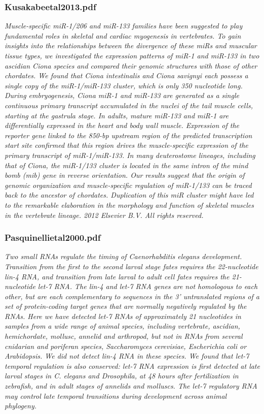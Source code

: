 \documentclass[graybox]{svmult}
\begin{document}
\subsubsection{Kusakabeetal2013.pdf}
\cite{Kusakabe2013}
\textit{Muscle-specific miR-1/206 and miR-133 families have been suggested to play fundamental roles in skeletal and cardiac myogenesis in vertebrates. To gain insights into the relationships between the divergence of these miRs and muscular tissue types, we investigated the expression patterns of miR-1 and miR-133 in two ascidian Ciona species and compared their genomic structures with those of other chordates. We found that Ciona intestinalis and Ciona savignyi each possess a single copy of the miR-1/miR-133 cluster, which is only 350 nucleotide long. During embryogenesis, Ciona miR-1 and miR-133 are generated as a single continuous primary transcript accumulated in the nuclei of the tail muscle cells, starting at the gastrula stage. In adults, mature miR-133 and miR-1 are differentially expressed in the heart and body wall muscle. Expression of the reporter gene linked to the 850-bp upstream region of the predicted transcription start site confirmed that this region drives the muscle-specific expression of the primary transcript of miR-1/miR-133. In many deuterostome lineages, including that of Ciona, the miR-1/133 cluster is located in the same intron of the mind bomb (mib) gene in reverse orientation. Our results suggest that the origin of genomic organization and muscle-specific regulation of miR-1/133 can be traced back to the ancestor of chordates. Duplication of this miR cluster might have led to the remarkable elaboration in the morphology and function of skeletal muscles in the vertebrate lineage. {\textcopyright} 2012 Elsevier B.V. All rights reserved.}

\subsubsection{Pasquinellietal2000.pdf}

\cite{Pasquinelli2000}
\textit{Two small RNAs regulate the timing of Caenorhabditis elegans development. Transition from the first to the second larval stage fates requires the 22-nucleotide lin-4 RNA, and transition from late larval to adult cell fates requires the 21-nucleotide let-7 RNA. The lin-4 and let-7 RNA genes are not homologous to each other, but are each complementary to sequences in the 3' untranslated regions of a set of protein-coding target genes that are normally negatively regulated by the RNAs. Here we have detected let-7 RNAs of approximately 21 nucleotides in samples from a wide range of animal species, including vertebrate, ascidian, hemichordate, mollusc, annelid and arthropod, but not in RNAs from several cnidarian and poriferan species, Saccharomyces cerevisiae, Escherichia coli or Arabidopsis. We did not detect lin-4 RNA in these species. We found that let-7 temporal regulation is also conserved: let-7 RNA expression is first detected at late larval stages in C. elegans and Drosophila, at 48 hours after fertilization in zebrafish, and in adult stages of annelids and molluscs. The let-7 regulatory RNA may control late temporal transitions during development across animal phylogeny.}
\end{document}
